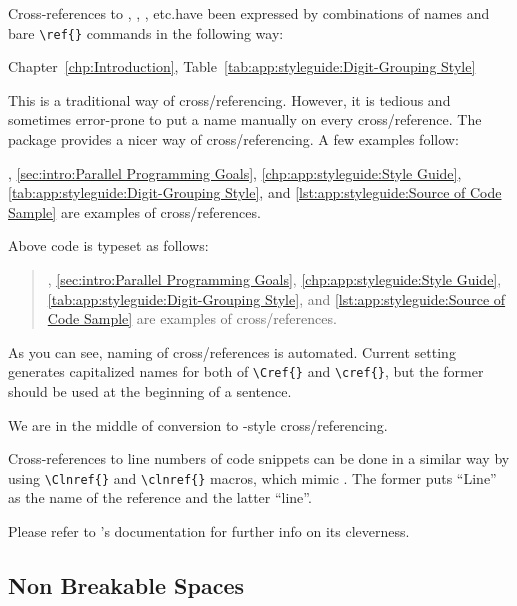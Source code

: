 Cross-references to ,
,
, etc.\@ have
been expressed by combinations of names and bare \verb|\ref{}|
commands in the following way:

\begin{VerbatimN}
Chapter~\ref{chp:Introduction},
Table~\ref{tab:app:styleguide:Digit-Grouping Style}
\end{VerbatimN}

This is a traditional way of cross\-/referencing.
However, it is tedious and sometimes error-prone to put a name
manually on every cross\-/reference.
The  package provides a nicer way of cross\-/referencing.
A few examples follow:

\begin{VerbatimN}
,
\cref{sec:intro:Parallel Programming Goals},
\cref{chp:app:styleguide:Style Guide},
\cref{tab:app:styleguide:Digit-Grouping Style}, and
\cref{lst:app:styleguide:Source of Code Sample} are
examples of cross\-/references.
\end{VerbatimN}

Above code is typeset as follows:

\begin{quote}
,
\cref{sec:intro:Parallel Programming Goals},
\cref{chp:app:styleguide:Style Guide},
\cref{tab:app:styleguide:Digit-Grouping Style}, and
\cref{lst:app:styleguide:Source of Code Sample} are
examples of cross\-/references.
\end{quote}

As you can see, naming of cross\-/references is automated.
Current setting generates capitalized names for both of
\verb|\Cref{}| and \verb|\cref{}|, but the former
should be used at the beginning of a sentence.

We are in the middle of conversion to
-style cross\-/referencing.

Cross-references to line numbers of code snippets
can be done in a similar way by using \verb|\Clnref{}| and
\verb|\clnref{}| macros, which mimic .
The former puts ``Line'' as the name of the reference
and the latter ``line''.

Please refer to 's documentation for further
info on its cleverness.

\subsection{Non Breakable Spaces}
\label{sec:app:styleguide:Non Breakable Spaces}

